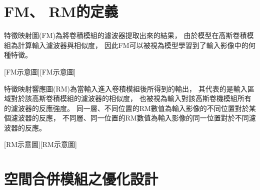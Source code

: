 \documentclass[class=NCU_thesis, crop=false]{standalone}
\begin{document}
\section{FM、 RM的定義}
	特徵映射圖(FM)為將卷積模組的濾波器提取出來的結果，
	由於模型在高斯卷積模組為計算輸入濾波器與相似度，
	因此FM可以被視為模型學習到了輸入影像中的何種特徵。

	[FM示意圖][FM示意圖]

	特徵映射響應圖(RM)為當輸入進入卷積模組後所得到的輸出，
	其代表的是輸入區域對於該高斯卷積模組的濾波器的相似度，
	也被視為輸入對該高斯卷機模組所有的濾波器的反應強度。
	同一層、不同位置的RM數值為輸入影像的不同位置對於某個濾波器的反應，
	不同層、同一位置的RM數值為輸入影像的同一位置對於不同濾波器的反應。

	[RM示意圖][RM示意圖]

\pagebreak
\section{空間合併模組之優化設計}
		

\end{document}
